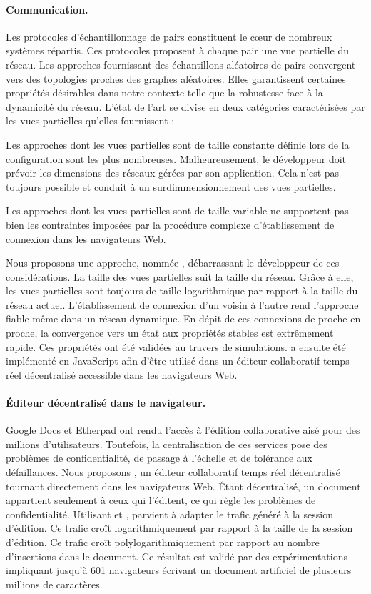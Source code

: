 \paragraph{Communication.} Les protocoles d'échantillonnage de pairs constituent
le cœur de nombreux systèmes répartis. Ces protocoles proposent à chaque pair
une vue partielle du réseau. Les approches fournissant des échantillons
aléatoires de pairs convergent vers des topologies proches des graphes
aléatoires. Elles garantissent certaines propriétés désirables dans notre
contexte telle que la robustesse face à la dynamicité du réseau.  L'état de
l'art se divise en deux catégories caractérisées par les vues partielles
qu'elles fournissent :
\begin{inparaenum}[(i)]
\item Les approches dont les vues partielles sont de taille constante définie
  lors de la configuration sont les plus nombreuses. Malheureusement, le
  développeur doit prévoir les dimensions des réseaux gérées par son
  application. Cela n'est pas toujours possible et conduit à un
  surdimmensionnement des vues partielles.
\item Les approches dont les vues partielles sont de taille variable ne
  supportent pas bien les contraintes imposées par la procédure complexe
  d'établissement de connexion dans les navigateurs Web.
\end{inparaenum}
Nous proposons une approche, nommée \SPRAY, débarrassant le développeur de ces
considérations. La taille des vues partielles suit la taille du réseau. Grâce à
elle, les vues partielles sont toujours de taille logarithmique par rapport à la
taille du réseau actuel. L'établissement de connexion d'un voisin à l'autre
rend l'approche fiable même dans un réseau dynamique. En dépit de ces connexions
de proche en proche, la convergence vers un état aux propriétés stables est
extrêmement rapide. Ces propriétés ont été validées au travers de
simulations. \SPRAY a ensuite été implémenté en JavaScript afin d'être utilisé
dans un éditeur collaboratif temps réel décentralisé accessible dans les
navigateurs Web.

\paragraph{Éditeur décentralisé dans le navigateur.} Google Docs et Etherpad ont
rendu l'accès à l'édition collaborative aisé pour des millions
d'utilisateurs. Toutefois, la centralisation de ces services pose des problèmes
de confidentialité, de passage à l'échelle et de tolérance aux
défaillances. Nous proposons \CRATE, un éditeur collaboratif temps réel
décentralisé tournant directement dans les navigateurs Web. Étant décentralisé,
un document appartient seulement à ceux qui l'éditent, ce qui règle les
problèmes de confidentialité. Utilisant \SPRAY et \LSEQ, \CRATE parvient à
adapter le trafic généré à la session d'édition. Ce trafic croît
logarithmiquement par rapport à la taille de la session d'édition. Ce trafic
croît polylogarithmiquement par rapport au nombre d'insertions dans le
document. Ce résultat est validé par des expérimentations impliquant jusqu'à 601
navigateurs écrivant un document artificiel de plusieurs millions de caractères.

